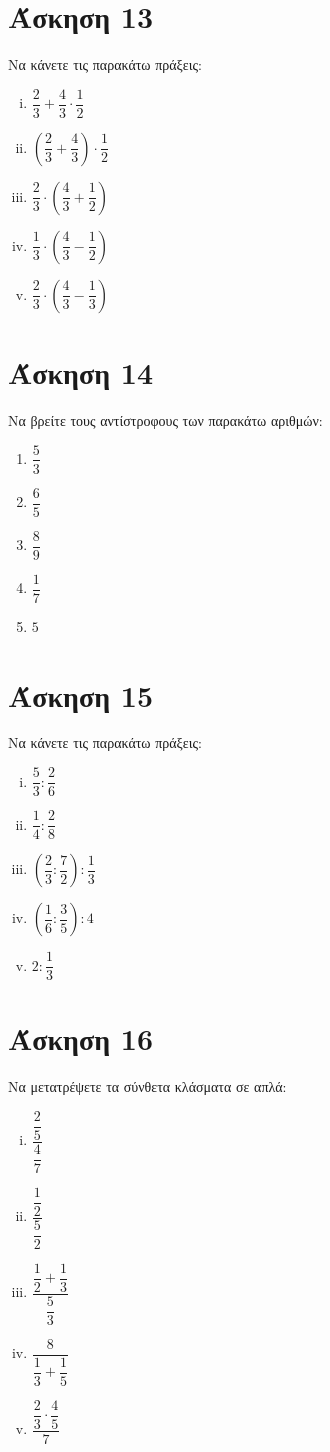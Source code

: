 \documentclass[a4paper,10pt]{report}
\begin{document}
\section*{Άσκηση 13  \hfill \small{}}
Να κάνετε τις παρακάτω πράξεις:
\begin{enumerate}[i)]
 \item $\dfrac{2}{3}+\dfrac{4}{3}\cdot \dfrac{1}{2}$
 \item $(\dfrac{2}{3}+\dfrac{4}{3})\cdot \dfrac{1}{2}$
 \item $\dfrac{2}{3}\cdot (\dfrac{4}{3}+\dfrac{1}{2})$
 \item $\dfrac{1}{3}\cdot (\dfrac{4}{3}-\dfrac{1}{2})$
 \item $\dfrac{2}{3}\cdot (\dfrac{4}{3}-\dfrac{1}{3})$
\end{enumerate}

\section*{Άσκηση 14  \hfill \small{}}
Να βρείτε τους αντίστροφους των παρακάτω αριθμών:
\begin{enumerate}
 \item $\dfrac{5}{3}$
 \item $\dfrac{6}{5}$
 \item $\dfrac{8}{9}$
 \item $\dfrac{1}{7}$
 \item $5$
\end{enumerate}

\section*{Άσκηση 15  \hfill \small{}}
Να κάνετε τις παρακάτω πράξεις:
\begin{enumerate}[i)]
 \item $\dfrac{5}{3}:\dfrac{2}{6}$
 \item $\dfrac{1}{4}:\dfrac{2}{8}$
 \item $(\dfrac{2}{3}:\dfrac{7}{2}):\dfrac{1}{3}$
 \item $(\dfrac{1}{6}:\dfrac{3}{5}):4$
 \item $2:\dfrac{1}{3}$
\end{enumerate}

\section*{Άσκηση 16  \hfill \small{}}
Να μετατρέψετε τα σύνθετα κλάσματα σε απλά:
\begin{enumerate}[i)]
 \item $\dfrac{\dfrac{2}{5}}{\dfrac{4}{7}}$
 \item $\dfrac{\dfrac{1}{2}}{\dfrac{5}{2}}$
 \item $\dfrac{\dfrac{1}{2}+\dfrac{1}{3}}{\dfrac{5}{3}}$
 \item $\dfrac{8}{\dfrac{1}{3}+\dfrac{1}{5}}$
 \item $\dfrac{\dfrac{2}{3}\cdot \dfrac{4}{5}}{7}$
\end{enumerate}
\end{document}
